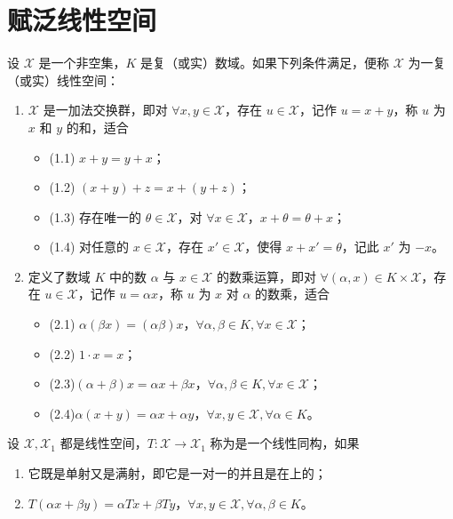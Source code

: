 \documentclass[lang=cn,newtx,10pt,scheme=chinese,thmcnt=chapter]{elegantbook}
\begin{document}
\section{赋泛线性空间}\begin{definition}
设 $\mathscr{X}$ 是一个非空集，$K$ 是复（或实）数域。如果下列条件满足，便称 $\mathscr{X}$ 为一复（或实）线性空间：

\begin{enumerate}
  \item $\mathscr{X}$ 是一加法交换群，即对 $\forall x, y \in \mathscr{X}$，存在 $u \in \mathscr{X}$，记作 $u = x + y$，称 $u$ 为 $x$ 和 $y$ 的和，适合
  \begin{itemize}
    \item (1.1) $x + y = y + x$；
    \item (1.2) $(x + y) + z = x + (y + z)$；
    \item (1.3) 存在唯一的 $\theta \in \mathscr{X}$，对 $\forall x \in \mathscr{X}$，$x + \theta = \theta + x$；
    \item (1.4) 对任意的 $x \in \mathscr{X}$，存在 $x' \in \mathscr{X}$，使得 $x + x' = \theta$，记此 $x'$ 为 $-x$。
  \end{itemize}
  \item 定义了数域 $K$ 中的数 $\alpha$ 与 $x \in \mathscr{X}$ 的数乘运算，即对 $\forall (\alpha, x) \in K \times \mathscr{X}$，存在 $u \in \mathscr{X}$，记作 $u = \alpha x$，称 $u$ 为 $x$ 对 $\alpha$ 的数乘，适合
  \begin{itemize}
    \item (2.1) $\alpha (\beta x) = (\alpha \beta) x$，$\forall \alpha, \beta \in K, \forall x \in \mathscr{X}$；
    \item (2.2) $1 \cdot x = x$；
    \item (2.3)$(\alpha + \beta) x = \alpha x + \beta x$，$\forall \alpha, \beta \in K, \forall x \in \mathscr{X}$；
    \item (2.4)$\alpha (x + y) = \alpha x + \alpha y$，$\forall x, y \in \mathscr{X}, \forall \alpha \in K$。
  \end{itemize}
\end{enumerate}
\end{definition}

\begin{definition}[线性同构]
设 $\mathscr{X}, \mathscr{X}_1$ 都是线性空间，$T: \mathscr{X} \rightarrow \mathscr{X}_1$ 称为是一个线性同构，如果
\begin{enumerate}
  \item 它既是单射又是满射，即它是一对一的并且是在上的；
  \item $T(\alpha x + \beta y) = \alpha T x + \beta T y$，$\forall x, y \in \mathscr{X}, \forall \alpha, \beta \in K$。
\end{enumerate}
\end{definition}
\end{document}
